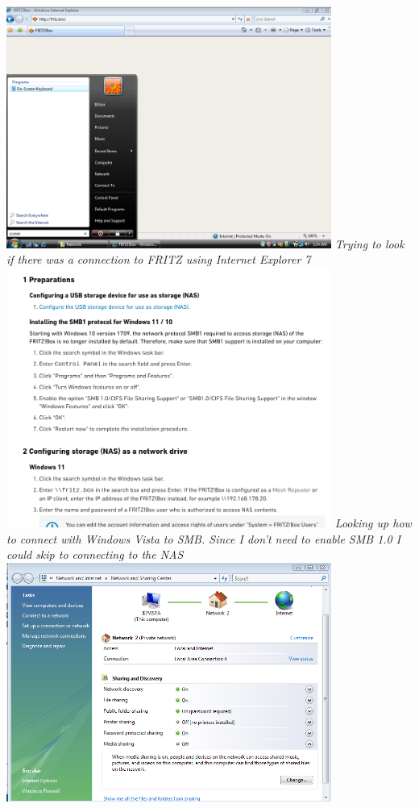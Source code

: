 \documentclass[12pt, letterpaper]{article}
\begin{document}
\includegraphics[width=0.8\textwidth]{fotos/PVI/Windows Vista/fritzbox was not loading vista.png}
\break
\emph{Trying to look if there was a connection to FRITZ using Internet Explorer 7}
\hfill\break
\hfill\break
\includegraphics[width=0.8\textwidth]{fotos/PVI/Windows Vista/fritzbox setup.png}
\break
\emph{Looking up how to connect with Windows Vista to SMB. Since I don't need to enable SMB 1.0 I could skip to connecting to the NAS}
\hfill\break
\hfill\break
\includegraphics[width=0.8\textwidth]{fotos/PVI/Windows Vista/windos vista sharing center.png}
\end{document}
